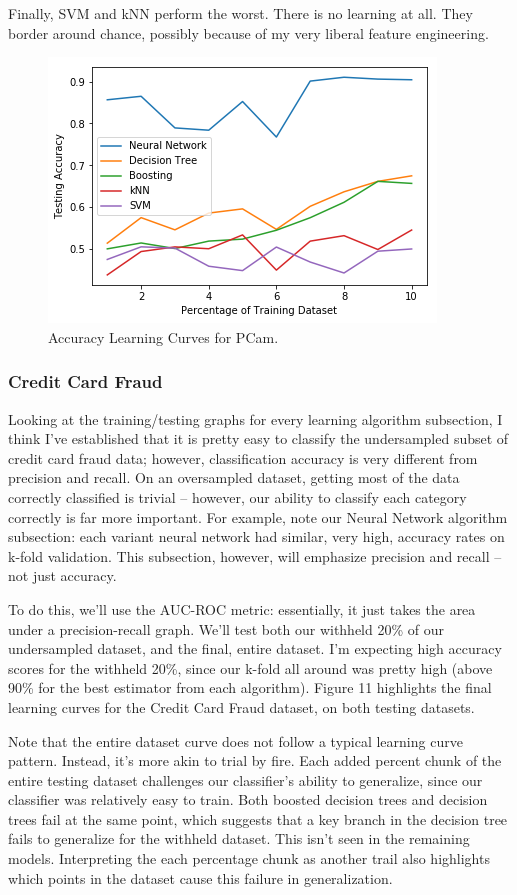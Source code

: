 \documentclass[a4paper]{article}
\begin{document}
Finally, SVM and kNN perform the worst. There is no learning at all. They border around chance, possibly because of my very liberal feature engineering.
\begin{figure}
  \centering
  \includegraphics[width=.5\textwidth]{images/pcam_tests.png}
  \caption{Accuracy Learning Curves for PCam.}
\end{figure}
\subsubsection{Credit Card Fraud}
Looking at the training/testing graphs for every learning algorithm subsection, I think I've established that it is pretty easy to classify the undersampled subset of credit card fraud data; however, classification accuracy is very different from precision and recall. On an oversampled dataset, getting most of the data correctly classified is trivial -- however, our ability to classify each category correctly is far more important. For example, note our Neural Network algorithm subsection: each variant neural network had similar, very high, accuracy rates on k-fold validation. This subsection, however, will emphasize precision and recall -- not just accuracy.

To do this, we'll use the AUC-ROC metric: essentially, it just takes the area under a precision-recall graph. We'll test both our withheld 20\% of our undersampled dataset, and the final, entire dataset. I'm expecting high accuracy scores for the withheld 20\%, since our k-fold all around was pretty high (above 90\% for the best estimator from each algorithm). Figure 11 highlights the final learning curves for the Credit Card Fraud dataset, on both testing datasets.

Note that the entire dataset curve does not follow a typical learning curve pattern. Instead, it's more akin to trial by fire. Each added percent chunk of the entire testing dataset challenges our classifier's ability to generalize, since our classifier was relatively easy to train. Both boosted decision trees and decision trees fail at the same point, which suggests that a key branch in the decision tree fails to generalize for the withheld dataset. This isn't seen in the remaining models. Interpreting the each percentage chunk as another trail also highlights which points in the dataset cause this failure in generalization.
\end{document}
